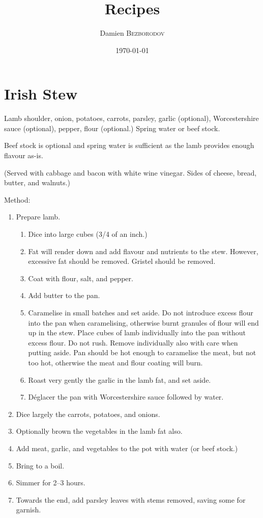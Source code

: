 \documentclass[a4paper,1em]{article}
\title{
    Recipes
}
\date{\today}
\author{
    Damien \textsc{Bezborodov}
}
\begin{document}
\maketitle

\tableofcontents

\newpage
\section{Irish Stew}

Lamb shoulder, onion, potatoes, carrots, parsley, garlic (optional),
Worcestershire sauce (optional), pepper, flour (optional.) Spring water or beef stock.

Beef stock is optional and spring water is sufficient as the lamb provides enough flavour as-is.

(Served with cabbage and bacon with white wine vinegar. Sides of cheese, bread, butter, and walnuts.)

Method:

\begin{enumerate}
    \item Prepare lamb.
    \begin{enumerate}
        \item Dice into large cubes (3/4 of an inch.)
        \item Fat will render down and add flavour and nutrients to the stew. However,
            excessive fat should be removed. Gristel should be removed.
        \item Coat with flour, salt, and pepper.
        \item Add butter to the pan.
        \item Caramelise in small batches and set aside.
            Do not introduce excess flour into the pan when caramelising,
            otherwise burnt granules of flour will end up in the stew. Place
            cubes of lamb individually into the pan without excess flour.  Do
            not rush. Remove individually also with care when putting aside.
            Pan should be hot enough to caramelise the meat, but not too hot,
            otherwise the meat and flour coating will burn.
        \item Roast very gently the garlic in the lamb fat, and set aside.
        \item Déglacer the pan with Worcestershire sauce followed by water.
    \end{enumerate}
    \item Dice largely the carrots, potatoes, and onions.
    \item Optionally brown the vegetables in the lamb fat also.
    \item Add meat, garlic, and vegetables to the pot with water (or beef stock.)
    \item Bring to a boil.
    \item Simmer for 2–3 hours.
    \item Towards the end, add parsley leaves with stems removed, saving some for garnish.
\end{enumerate}
\end{document}
